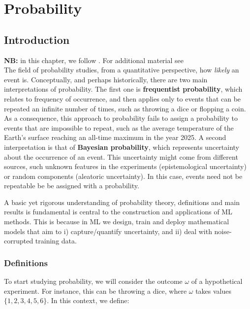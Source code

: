 

\section{Probability}
\label{cap:probability}

\subsection{Introduction}
\label{cap:prob_intro}

\textbf{NB:} in this chapter, we follow \cite{pml1Book,deisenroth2020mathematics}. For additional material see \cite{durrett2019probability,bertsekas2008introduction,grimmett2020probability}\\

\noindent The field of probability studies, from a quantitative perspective, how \emph{likely} an event is. Conceptually, and perhaps historically, there are two main interpretations of probability. The first one is \textbf{frequentist probability}, which relates to frequency of occurrence, and then applies only to events that can be repeated an infinite number of times, such as throwing a dice or flopping a coin. As a consequence, this approach to probability fails to assign a probability to events that are impossible to repeat, such as the average temperature of the Earth's surface reaching an all-time maximum in the year 2025. A second interpretation is that of \textbf{Bayesian probability}, which represents uncertainty about the occurrence of an event. This uncertainty might come from different sources, such unknown features in the experiments (epistemological uncertainty) or random components (aleatoric uncertainty). In this case, events need not be repeatable be be assigned with a probability.

A basic yet rigorous understanding of probability theory, definitions and main results is fundamental is central to the construction and applications of ML methods. This is because in ML we design, train and deploy mathematical models that aim to i) capture/quantify uncertainty, and ii) deal with noise-corrupted training data. 


\subsubsection{Definitions}
\label{cap:prob_defs}

To start studying probability, we will consider the outcome $\omega$ of a hypothetical experiment. For instance, this can be throwing a dice, where $\omega$ takes values $\{1,2,3,4,5,6\}$. In this context, we define: 

